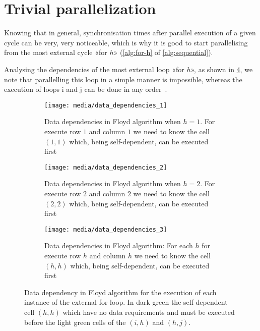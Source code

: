 \section{Trivial parallelization}\label{trivial_parallelization}

Knowing that in general, synchronisation times after parallel execution of a given cycle can be very, very noticeable, which is why it is good to start parallelising from the most external cycle «for \(h\)» (\cref{alg:for-h} of \cref{alg:sequential}).

Analysing the dependencies of the most external loop «for \(h\)», as shown in \cref{fig:data-dependency-external-loop}, we note that parallelling this loop in a simple manner is impossible, whereas the execution of loops i and j can be done in any order~\cite{rucci}.

\begin{figure}[htbp]
    \centering
    \begin{subfigure}[t]{0.3\textwidth}
        \centering
        \texttt{[image: media/data\_dependencies\_1]}
        \caption{Data dependencies in Floyd algorithm when \(h=1\). For execute row \(1\) and column \(1\) we need to know the cell \((1,1)\) which, being self-dependent, can be executed first}
        \label{fig:data-dependencies-1}
    \end{subfigure}
    \hfill
    \begin{subfigure}[t]{0.3\textwidth}
        \centering
        \texttt{[image: media/data\_dependencies\_2]}
        \caption{Data dependencies in Floyd algorithm when \(h=2\). For execute row \(2\) and column \(2\) we need to know the cell \((2,2)\) which, being self-dependent, can be executed first}
        \label{fig:data-dependencies-2}
    \end{subfigure}
    \hfill
    \begin{subfigure}[t]{0.3\textwidth}
        \centering
        \texttt{[image: media/data\_dependencies\_3]}
        \caption{Data dependencies in Floyd algorithm: For each \(h\) for execute row \(h\) and column \(h\) we need to know the cell \((h,h)\) which, being self-dependent, can be executed first}
        \label{fig:data-dependencies-3}
    \end{subfigure}
    \caption{Data dependency in Floyd algorithm for the execution of each instance of the external for loop. In dark green the self-dependent cell \((h,h)\) which have no data requirements and must be  executed before the light green cells of the \((i,h)\) and \((h,j)\).}
    \label{fig:data-dependency-external-loop}
\end{figure}

